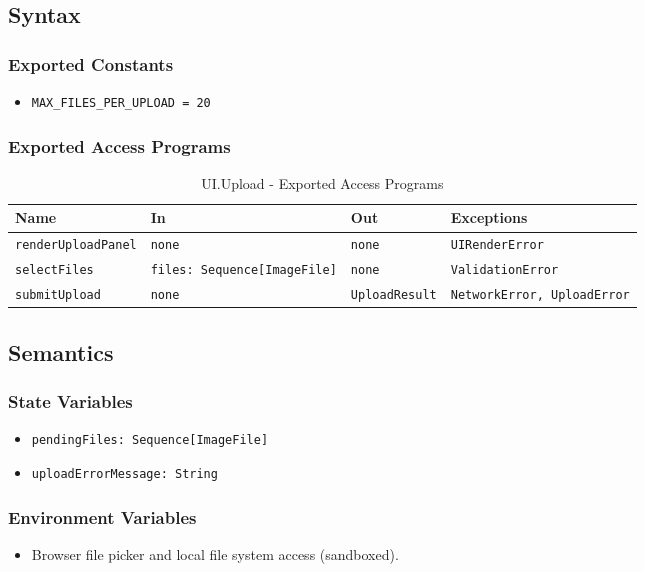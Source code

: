 \documentclass[12pt, titlepage]{article}
\begin{document}
\subsection{Syntax}

\subsubsection{Exported Constants}
\begin{itemize}
    \item \texttt{MAX\_FILES\_PER\_UPLOAD = 20}
\end{itemize}

\subsubsection{Exported Access Programs}

\begin{table}[H]
\centering
\small
\caption{UI.Upload - Exported Access Programs}
\begin{tabular}{p{3.5cm} p{4cm} p{2.8cm} p{3.7cm}}
\toprule
\textbf{Name} & \textbf{In} & \textbf{Out} & \textbf{Exceptions} \\
\midrule
\texttt{renderUploadPanel} & \texttt{none} & \texttt{none} & \texttt{UIRenderError} \\
\texttt{selectFiles} & \texttt{files: Sequence[ImageFile]} & \texttt{none} & \texttt{ValidationError} \\
\texttt{submitUpload} & \texttt{none} & \texttt{UploadResult} & \texttt{NetworkError, UploadError} \\
\bottomrule
\end{tabular}
\end{table}

\subsection{Semantics}

\subsubsection{State Variables}
\begin{itemize}
    \item \texttt{pendingFiles: Sequence[ImageFile]}
    \item \texttt{uploadErrorMessage: String}
\end{itemize}

\subsubsection{Environment Variables}
\begin{itemize}
    \item Browser file picker and local file system access (sandboxed).
\end{itemize}
\end{document}
